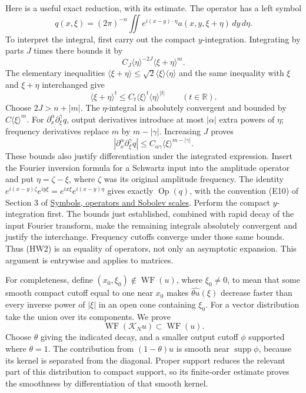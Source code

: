 \documentclass[
  11pt,
]{article}
\begin{document}
Here is a useful exact reduction, with its estimate. The operator has a
left symbol \[
 q(x,\xi)=(2\pi)^{-n}\iint e^{i(x-y)\cdot\eta}
                           a(x,y,\xi+\eta)\,dy\,d\eta.         \tag{HW2}
\] To interpret the integral, first carry out the compact
\(y\)-integration. Integrating by parts \(J\) times there bounds it by
\[
 C_J\langle\eta\rangle^{-2J}\langle\xi+\eta\rangle^m.
\] The elementary inequalities
\(\langle\xi+\eta\rangle\leq\sqrt2\langle\xi\rangle\langle\eta\rangle\)
and the same inequality with \(\xi\) and \(\xi+\eta\) interchanged give
\[
 \langle\xi+\eta\rangle^t
             \leq C_t\langle\xi\rangle^t\langle\eta\rangle^{|t|}
                  \qquad(t\in\mathbb R).                     \tag{HW3}
\] Choose \(2J>n+|m|\). The \(\eta\)-integral is absolutely convergent
and bounded by \(C\langle\xi\rangle^m\). For
\(\partial_x^\alpha\partial_\xi^\gamma q\), output derivatives introduce
at most \(|\alpha|\) extra powers of \(\eta\); frequency derivatives
replace \(m\) by \(m-|\gamma|\). Increasing \(J\) proves \[
               |\partial_x^\alpha\partial_\xi^\gamma q|
                    \leq C_{\alpha\gamma}\langle\xi\rangle^{m-|\gamma|}.
                                                               \tag{HW4}
\] These bounds also justify differentiation under the integrated
expression. Insert the Fourier inversion formula for a Schwartz input
into the amplitude operator and put \(\eta=\zeta-\xi\), where \(\zeta\)
was its original amplitude frequency. The identity
\(e^{i(x-y)\zeta}e^{iy\xi}=e^{ix\xi}e^{i(x-y)\eta}\) gives exactly
\(\operatorname{Op}(q)\), with the convention (E10) of Section 3 of
\href{euclidean-symbol-calculus.pdf}{Symbols, operators and Sobolev
scales}. Perform the compact \(y\)-integration first. The bounds just
established, combined with rapid decay of the input Fourier transform,
make the remaining integrals absolutely convergent and justify the
interchange. Frequency cutoffs converge under those same bounds. Thus
(HW2) is an equality of operators, not only an asymptotic expansion.
This argument is entrywise and applies to matrices.

For completeness, define \((x_0,\xi_0)\notin\operatorname{WF}(u)\),
where \(\xi_0\ne0\), to mean that some smooth compact cutoff equal to
one near \(x_0\) makes \(\widehat{\theta u}(\xi)\) decrease faster than
every inverse power of \(|\xi|\) in an open cone containing \(\xi_0\).
For a vector distribution take the union over its components. We prove
\[
                    \operatorname{WF}(\mathcal K_Nu)\subset
                                 \operatorname{WF}(u).       \tag{HW5}
\] Choose \(\theta\) giving the indicated decay, and a smaller output
cutoff \(\phi\) supported where \(\theta=1\). The contribution from
\((1-\theta)u\) is smooth near \(\operatorname{supp}\phi\), because its
kernel is separated from the diagonal. Proper support reduces the
relevant part of this distribution to compact support, so its
finite-order estimate proves the smoothness by differentiation of that
smooth kernel.
\end{document}
